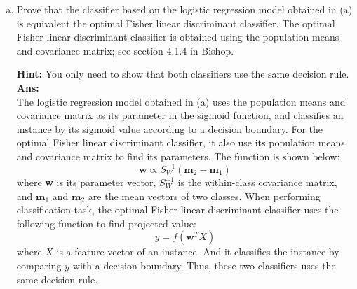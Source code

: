 \documentclass[11pt]{article}
\begin{document}
\begin{enumerate}[(a)]
\item Prove that the classifier based on the logistic regression model obtained in (a) is equivalent the optimal Fisher linear discriminant classifier.  The optimal Fisher linear discriminant classifier is obtained using the population means and covariance matrix; see section 4.1.4 in Bishop.

{\bf Hint:} You only need to show that both classifiers use the same decision rule.\\
\textbf{Ans:}\\
The logistic regression model obtained in (a) uses the population means and covariance matrix as its parameter in the sigmoid function, and classifies an instance by its sigmoid value according to a decision boundary. For the optimal Fisher linear discriminant classifier, it also use its population means and covariance matrix to find its parameters. The function is shown below:\\
$$\textbf{w} \propto S_W^{-1}(\textbf{m}_2 - \textbf{m}_1)$$
%
where \textbf{w} is its parameter vector, $S_W^{-1}$ is the within-class covariance matrix, and $\textbf{m}_1$ and $\textbf{m}_2$ are the mean vectors of two classes.  When performing classification task, the optimal Fisher linear discriminant classifier uses the following function to find projected value:
$$y = f(\textbf{w}^TX)$$
where $X$ is a feature vector of an instance. And it classifies the instance by comparing $y$ with a decision boundary. Thus, these two classifiers uses the same decision rule.
\end{enumerate}

\end{document}
